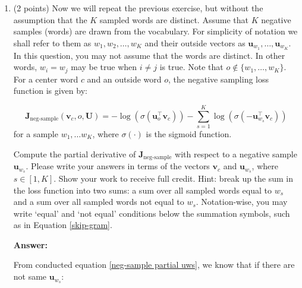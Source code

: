 \documentclass{article}
\newenvironment{answer}{
    {\bf Answer:} \sf \begingroup\color{red}
}{\endgroup}%
\begin{document}
\begin{enumerate}[label=(\alph*)]
\begin{shaded}
\begin{answer}
\begin{enumerate}[label = (\roman*)]
    \[\sigma(\bm U_{o, \{w_1,\dots,w_K\}}^\top \bm v_c) - 1 = \left[\sigma(\bm u_o^\top \bm v_c) - 1, \sigma(- \bm u_{w_1}^\top \bm v_c) - 1, \dots, \sigma(- \bm u_{w_K}^\top \bm v_c) - 1\right]\]

    because the practical derivatives share the similar term like this.
    \item The size of vocabulary may be computationally huge and any update we do or evaluation of naive-softmax loss function would take $O(|\text{Vocab}|)$ time. Instead of looping over entire vocabulary, this loss function just sample several negative examples, which would be more efficient.
\end{enumerate}
\end{answer}
\end{shaded}

\item (2 points) Now we will repeat the previous exercise, but without the assumption that the $K$ sampled words are distinct.  Assume that $K$ negative samples (words) are drawn from the vocabulary. For simplicity of notation we shall refer to them as $w_1, w_2, \dots, w_K$ and their outside vectors as $\bm u_{w_1}, \dots, \bm u_{w_K}$. In this question, you may not assume that the words are distinct. In other words, $w_i=w_j$ may be true when $i\neq j$ is true.
Note that $o\notin\{w_1, \dots, w_K\}$. 
For a center word $c$ and an outside word $o$, the negative sampling loss function is given by:

\begin{equation}
\bm J_{\text{neg-sample}}(\bm v_c, o, \bm U) = -\log(\sigma(\bm u_o^\top \bm v_c)) - \sum_{s=1}^K \log(\sigma(-\bm u_{w_s}^\top \bm v_c))
\end{equation}
for a sample $w_1, \ldots w_K$, where $\sigma(\cdot)$ is the sigmoid function.

Compute the partial derivative of $\bm J_{\text{neg-sample}}$ with respect to a negative sample $\bm u_{w_s}$. Please write your answers in terms of the vectors $\bm v_c$ and $\bm u_{w_s}$, where $s \in [1, K]$. Show your work to receive full credit. Hint: break up the sum in the loss function into two sums: a sum over all sampled words equal to $w_s$ and a sum over all sampled words not equal to $w_s$. Notation-wise, you may write `equal' and `not equal' conditions below the summation symbols, such as in Equation \ref{skip-gram}.

\begin{shaded}
\begin{answer}
From conducted equation \ref{neg-sample partial uws}, we know that if there are not same $\bm u_{w_s}$:


\end{answer}
\end{shaded}
\end{enumerate}
\end{document}
